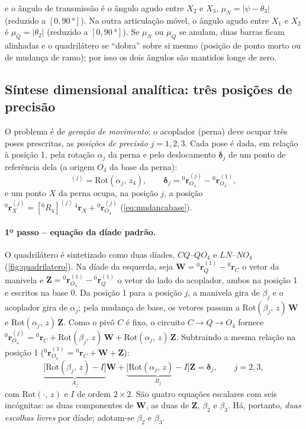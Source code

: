 \documentclass[12pt,a4paper,twoside]{article}
\newcommand{\rv}[2]{{}^{#1}\mathbf{r}_{#2}}          %
\newcommand{\Rm}[2]{[{}^{#1}R_{#2}]}                 %
\newcommand{\Rot}[2]{\mathrm{Rot}(#1,\,#2)}
\numberwithin{equation}{section}
\begin{document}
e o ângulo de transmissão é o ângulo agudo entre $X_2$ e $X_3$, $\mu_N = |\psi - \theta_3|$
(reduzido a $[0, \SI{90}{\degree}]$). Na outra articulação móvel, o ângulo agudo entre $X_1$ e
$X_2$ é $\mu_Q = |\theta_2|$ (reduzido a $[0, \SI{90}{\degree}]$). Se $\mu_N$ ou $\mu_Q$ se anulam, duas
barras ficam alinhadas e o quadrilátero se ``dobra'' sobre si mesmo (posição de ponto morto
ou de mudança de ramo); por isso os dois ângulos são mantidos longe de zero.

\subsection{Síntese dimensional analítica: três posições de precisão}\label{sec:diade}

O problema é de \emph{geração de movimento}: o acoplador (perna) deve ocupar três poses
prescritas, as \emph{posições de precisão} $j = 1, 2, 3$. Cada pose é dada, em relação à posição
1, pela rotação $\alpha_j$ da perna e pelo deslocamento $\boldsymbol\delta_j$ de um ponto de
referência dela (a origem $O_4$ da base da perna):
\begin{equation}
  \Rm{0}{4}^{(j)} = \Rot{\alpha_j}{z_4},
  \qquad
  \boldsymbol\delta_j = \rv{0}{O_4}^{(j)} - \rv{0}{O_4}^{(1)} ,
\end{equation}
e um ponto $X$ da perna ocupa, na posição $j$, a posição $\rv{0}{X}^{(j)} = \Rm{0}{4}^{(j)}\,\rv{4}{X} + \rv{0}{O_4}^{(j)}$
(\cref{eq:mudancabase}).

\paragraph{1º passo -- equação da díade padrão.} O quadrilátero é sintetizado como duas
díades, $CQ$--$QO_4$ e $LN$--$NO_4$ (\cref{fig:quadrilatero}). Na díade da esquerda, seja
$\mathbf W = \rv{0}{Q}^{(1)} - \rv{0}{C}$ o vetor da manivela e $\mathbf Z = \rv{0}{O_4}^{(1)} - \rv{0}{Q}^{(1)}$ o
vetor do lado do acoplador, ambos na posição 1 e escritos na base $0$. Da posição 1 para a
posição $j$, a manivela gira de $\beta_j$ e o acoplador gira de $\alpha_j$; pela mudança de base,
os vetores passam a $\Rot{\beta_j}{z}\,\mathbf W$ e $\Rot{\alpha_j}{z}\,\mathbf Z$. Como o pivô $C$ é fixo, o
circuito $C \to Q \to O_4$ fornece $\rv{0}{O_4}^{(j)} = \rv{0}{C} + \Rot{\beta_j}{z}\,\mathbf W + \Rot{\alpha_j}{z}\,\mathbf Z$.
Subtraindo a mesma relação na posição 1 ($\rv{0}{O_4}^{(1)} = \rv{0}{C} + \mathbf W + \mathbf Z$):
\begin{equation}
  \underbrace{\big[\Rot{\beta_j}{z} - I\big]}_{A_j}\mathbf W + \underbrace{\big[\Rot{\alpha_j}{z} - I\big]}_{B_j}\mathbf Z = \boldsymbol\delta_j ,
  \qquad j = 2, 3 ,
  \label{eq:diade}
\end{equation}
com $\Rot{\cdot}{z}$ e $I$ de ordem $2\times2$. São quatro equações escalares com seis incógnitas:
as duas componentes de $\mathbf W$, as duas de $\mathbf Z$, $\beta_2$ e $\beta_3$. Há, portanto, \emph{duas
escolhas livres} por díade; adotam-se $\beta_2$ e $\beta_3$.
\end{document}
